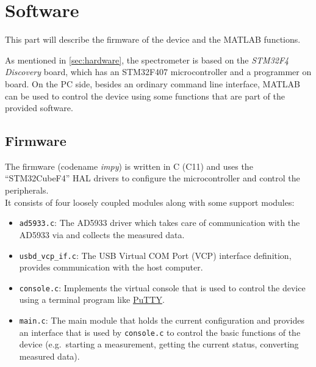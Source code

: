 \chapter{Software} \label{sec:software}

This part will describe the firmware of the device and the MATLAB functions.

As mentioned in \autoref{sec:hardware}, the spectrometer is based on the \emph{STM32F4 Discovery} board, which has
an STM32F407 microcontroller and a programmer on board. On the PC side, besides an ordinary command line interface,
MATLAB can be used to control the device using some functions that are part of the provided software.


\section{Firmware}

The firmware (codename \emph{impy}) is written in C (C11) and uses the \enquote{STM32CubeF4} HAL\footnotemark{} drivers
to configure the microcontroller and control the peripherals.
\\ It consists of four loosely coupled modules along with some support modules:
%
\begin{itemize}
	\item \verb!ad5933.c!: The AD5933 driver which takes care of communication with the AD5933 via \iic{} and collects
        the measured data.
  
  \item \verb!usbd_vcp_if.c!: The USB Virtual COM Port (VCP) interface definition, provides communication with the
        host computer.
  
  \item \verb!console.c!: Implements the virtual console that is used to control the device using a terminal
        program like \href{http://www.chiark.greenend.org.uk/~sgtatham/putty/}{PuTTY}.
  
  \item \verb!main.c!: The main module that holds the current configuration and provides an interface that is used
        by \verb!console.c! to control the basic functions of the device (e.g.\ starting a measurement, getting the
        current status, converting measured data).
\end{itemize}

